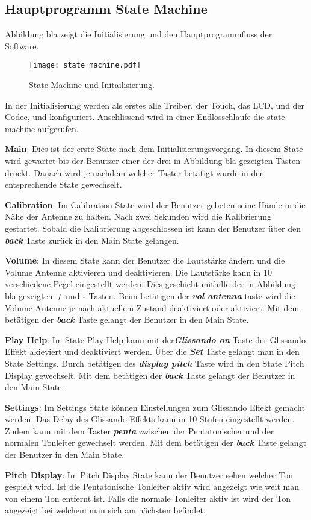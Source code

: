 \subsection{Hauptprogramm State Machine}\label{subsec:State_Machine}
Abbildung bla zeigt die Initialisierung und den Hauptprogrammfluss der Software.
\begin{figure}[h]
	\centering
	\texttt{[image: state\_machine.pdf]}
	\caption{State Machine und Initailisierung.}
	\label{img:Blockschaltbild_digital}
\end{figure}

In der Initialisierung werden als erstes alle Treiber, der Touch, das LCD, und der Codec, und  konfiguriert. Anschlissend wird in einer Endlosschlaufe die state machine aufgerufen.

\textbf{Main}:
Dies ist der erste State nach dem Initialisierungsvorgang. In diesem State wird gewartet bis der Benutzer einer der drei in Abbildung bla gezeigten Tasten drückt. Danach wird je nachdem welcher Taster betätigt wurde in den entsprechende State gewechselt. 
 
\textbf{Calibration}:
Im Calibration State wird der Benutzer gebeten seine Hände in die Nähe der Antenne zu halten.
Nach zwei Sekunden wird die Kalibrierung gestartet. Sobald die Kalibrierung abgeschlossen ist kann der Benutzer über den \textbf{\textit{back}} Taste zurück in den Main State gelangen.  

\textbf{Volume}:
In diesem State kann der Benutzer die Lautstärke ändern und die Volume Antenne aktivieren und deaktivieren. Die Lautstärke kann in 10 verschiedene Pegel eingestellt werden. Dies geschieht mithilfe der in Abbildung bla gezeigten \textbf{\textit{+}} und \textbf{\textit{-}} Tasten. Beim betätigen der \textbf{\textit{vol antenna}} taste wird die Volume Antenne je nach aktuellem Zustand deaktiviert oder aktiviert. Mit dem betätigen der \textbf{\textit{back}} Taste gelangt der Benutzer in den Main State.
 
\textbf{Play Help}:
Im State Play Help kann mit der\textbf{\textit{Glissando on}} Taste der Glissando Effekt akieviert und deaktiviert werden. Über die \textbf{\textit{Set}} Taste gelangt man in den State Settings. Durch betätigen des \textbf{\textit{display pitch}} Taste wird in den State Pitch Display gewechselt.  Mit dem betätigen der \textbf{\textit{back}} Taste gelangt der Benutzer in den Main State.

\textbf{Settings}:
Im Settings State können Einstellungen zum Glissando Effekt gemacht werden. Das Delay des Glissando Effekts kann in 10 Stufen eingestellt werden. Zudem kann mit dem Taster \textbf{\textit{penta}} zwischen der Pentatonischer und der normalen Tonleiter gewechselt werden. Mit dem betätigen der \textbf{\textit{back}} Taste gelangt der Benutzer in den Main State.

\textbf{Pitch Display}:
Im Pitch Display State kann der Benutzer sehen welcher Ton gespielt wird. Ist die Pentatonische Tonleiter aktiv wird angezeigt wie weit man von einem Ton entfernt ist. Falls die normale Tonleiter aktiv ist wird der Ton angezeigt bei welchem man sich am nächsten befindet.

